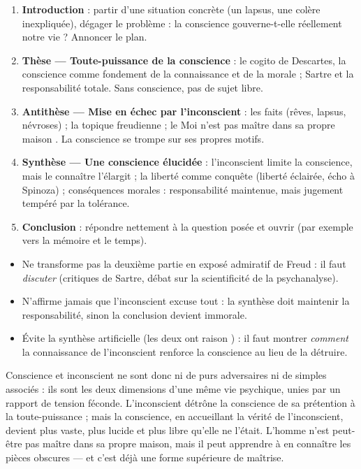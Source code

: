 \documentclass[11pt]{article}
\newcounter{popsec}
\newcounter{popsub}
\newcommand{\courssub}[1]{%
  \stepcounter{popsub}%
  \par\vspace{9pt}\noindent{\popxbold\fontsize{11.5}{13}\selectfont\color{popink}{\color{poporange}\thepopsec.\thepopsub}\hspace{6pt}#1}\par\nopagebreak\vspace{4pt}
}
\begin{document}
\begin{methode}
\begin{enumerate}
\item \textbf{Introduction} : partir d'une situation concrète (un lapsus, une colère inexpliquée), dégager le problème : la conscience gouverne-t-elle réellement notre vie ? Annoncer le plan.
\item \textbf{Thèse — Toute-puissance de la conscience} : le cogito de Descartes, la conscience comme fondement de la connaissance et de la morale ; Sartre et la responsabilité totale. Sans conscience, pas de sujet libre.
\item \textbf{Antithèse — Mise en échec par l'inconscient} : les faits (rêves, lapsus, névroses) ; la topique freudienne ; \og le Moi n'est pas maître dans sa propre maison \fg{}. La conscience se trompe sur ses propres motifs.
\item \textbf{Synthèse — Une conscience élucidée} : l'inconscient limite la conscience, mais le connaître l'élargit ; la liberté comme conquête (liberté éclairée, écho à Spinoza) ; conséquences morales : responsabilité maintenue, mais jugement tempéré par la tolérance.
\item \textbf{Conclusion} : répondre nettement à la question posée et ouvrir (par exemple vers la mémoire et le temps).
\end{enumerate}
\end{methode}

\begin{attention}
\begin{itemize}
\item Ne transforme pas la deuxième partie en exposé admiratif de Freud : il faut \emph{discuter} (critiques de Sartre, débat sur la scientificité de la psychanalyse).
\item N'affirme jamais que l'inconscient \og excuse tout \fg{} : la synthèse doit maintenir la responsabilité, sinon la conclusion devient immorale.
\item Évite la synthèse artificielle (\og les deux ont raison \fg{}) : il faut montrer \emph{comment} la connaissance de l'inconscient renforce la conscience au lieu de la détruire.
\end{itemize}
\end{attention}

\courssub{Conclusion et ouverture}

Conscience et inconscient ne sont donc ni de purs adversaires ni de simples associés : ils sont les deux dimensions d'une même vie psychique, unies par un rapport de tension féconde. L'inconscient détrône la conscience de sa prétention à la toute-puissance ; mais la conscience, en accueillant la vérité de l'inconscient, devient plus vaste, plus lucide et plus libre qu'elle ne l'était. L'homme n'est peut-être pas maître dans sa propre maison, mais il peut apprendre à en connaître les pièces obscures — et c'est déjà une forme supérieure de maîtrise.
\end{document}
